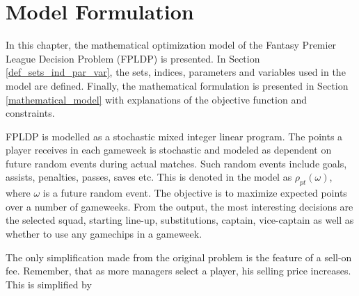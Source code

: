 
\chapter{Model Formulation} \label{chapter_model_formulation}

In this chapter, the mathematical optimization model of the Fantasy Premier League Decision Problem (FPLDP) is presented. In Section \ref{def_sets_ind_par_var}, the sets, indices, parameters and variables used in the model are defined. Finally, the mathematical formulation is presented in Section \ref{mathematical_model} with explanations of the objective function and constraints. 


\newpar

FPLDP is modelled as a stochastic mixed integer linear program. The points a player receives in each gameweek is stochastic and modeled as dependent on future random events during actual matches. Such random events include goals, assists, penalties, passes, saves etc. This is denoted in the model as $\rho_{pt}(\omega)$, where $\omega$ is a future random event. The objective is to maximize expected points over a number of gameweeks. From the output, the most interesting decisions are the selected squad, starting line-up, substitutions, captain, vice-captain as well as whether to use any gamechips in a gameweek. 

\newpar

The only simplification made from the original problem is the feature of a sell-on fee. Remember, that as more managers select a player, his selling price increases. This is simplified by 


\begin{comment}

The only uncertainty in this problem is the number of points a player will get in each gameweek. Hence, the model is formulated accordingly. All the uncertainty lies in the objective function, and this is presented by $\rho_{pt}(\omega)$. This represents the number of points for a player $p$ in a gameweek $t$ dependent on a realization of a future event $\omega$. This event denotes all the factors deciding a player's point in a gameweek. For a goalkeeper, that includes factors such as the number of goals conceded, number of saves, penalty saved etc.

\newpar

Though the objective function is formulated in such way that it maximizes the number of expected points, once the model is solved  the objective value itself is not of interest. In the end it is the optimal team selection for a gameweek that is significant. In addition, the captain- and vice-captain choice, as well as the substitution priority are important outputs. This is reflected in the model by having small positive parameters in the objective function to ensure that these are picked accordingly. 

\end{comment}





